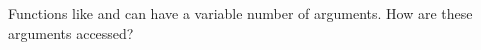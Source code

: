
Functions like \printf and \scanf can have a variable number of arguments.
How are these arguments accessed?







